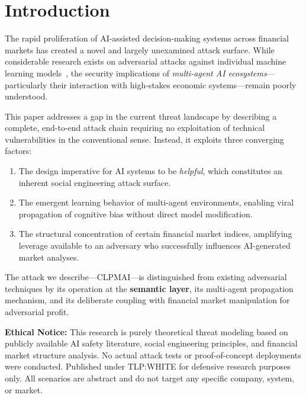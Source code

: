 \documentclass[11pt,a4paper]{article}
\begin{document}
\section{Introduction}

The rapid proliferation of AI-assisted decision-making systems across
financial markets has created a novel and largely unexamined attack surface.
While considerable research exists on adversarial attacks against individual
machine learning models~\cite{goodfellow2014,carlini2017}, the security
implications of \emph{multi-agent AI ecosystems}---particularly their
interaction with high-stakes economic systems---remain poorly understood.

This paper addresses a gap in the current threat landscape by describing a
complete, end-to-end attack chain requiring no exploitation of technical
vulnerabilities in the conventional sense. Instead, it exploits three
converging factors:

\begin{enumerate}[leftmargin=2em]
  \item The design imperative for AI systems to be \emph{helpful}, which
        constitutes an inherent social engineering attack surface.
  \item The emergent learning behavior of multi-agent environments, enabling
        viral propagation of cognitive bias without direct model modification.
  \item The structural concentration of certain financial market indices,
        amplifying leverage available to an adversary who successfully
        influences AI-generated market analyses.
\end{enumerate}

The attack we describe---CLPMAI---is distinguished from existing adversarial
techniques by its operation at the \textbf{semantic layer}, its multi-agent
propagation mechanism, and its deliberate coupling with financial market
manipulation for adversarial profit.

\begin{warningbox}
\textbf{\textcolor{warningtxt}{Ethical Notice:}} This research is purely
theoretical threat modeling based on publicly available AI safety literature,
social engineering principles, and financial market structure analysis.
No actual attack tests or proof-of-concept deployments were conducted.
Published under TLP:WHITE for defensive research purposes only. All scenarios
are abstract and do not target any specific company, system, or market.
\end{warningbox}
\end{document}
